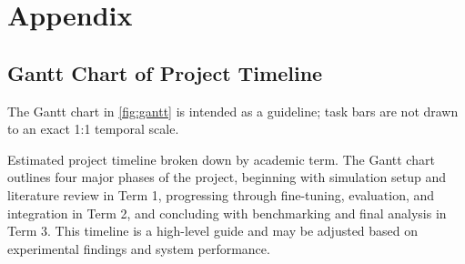 \chapter{Appendix}

\section{Gantt Chart of Project Timeline}
\label{sec:appendix_a}

The Gantt chart in \cref{fig:gantt} is intended as a guideline; task bars are not drawn to an exact 1:1 temporal scale.


{Estimated project timeline broken down by academic term. The Gantt chart outlines four major phases of the project, beginning with simulation setup and literature review in Term 1, progressing through fine-tuning, evaluation, and integration in Term 2, and concluding with benchmarking and final analysis in Term 3. This timeline is a high-level guide and may be adjusted based on experimental findings and system performance.}


